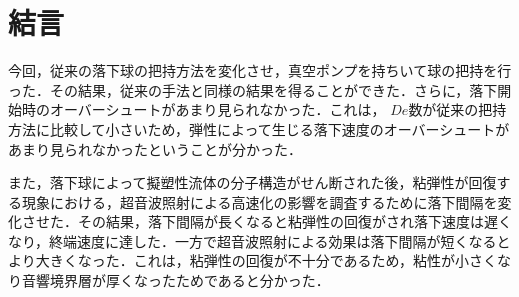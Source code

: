 \clearpage
\section{結言}

今回，従来の落下球の把持方法を変化させ，真空ポンプを持ちいて球の把持を行った．その結果，従来の手法と同様の結果を得ることができた．さらに，落下開始時のオーバーシュートがあまり見られなかった．これは，
$De$数が従来の把持方法に比較して小さいため，弾性によって生じる落下速度のオーバーシュートがあまり見られなかったということが分かった．

また，落下球によって擬塑性流体の分子構造がせん断された後，粘弾性が回復する現象における，超音波照射による高速化の影響を調査するために落下間隔を変化させた．その結果，落下間隔が長くなると粘弾性の回復がされ落下速度は遅くなり，終端速度に達した．一方で超音波照射による効果は落下間隔が短くなるとより大きくなった．これは，粘弾性の回復が不十分であるため，粘性が小さくなり音響境界層が厚くなったためであると分かった．


